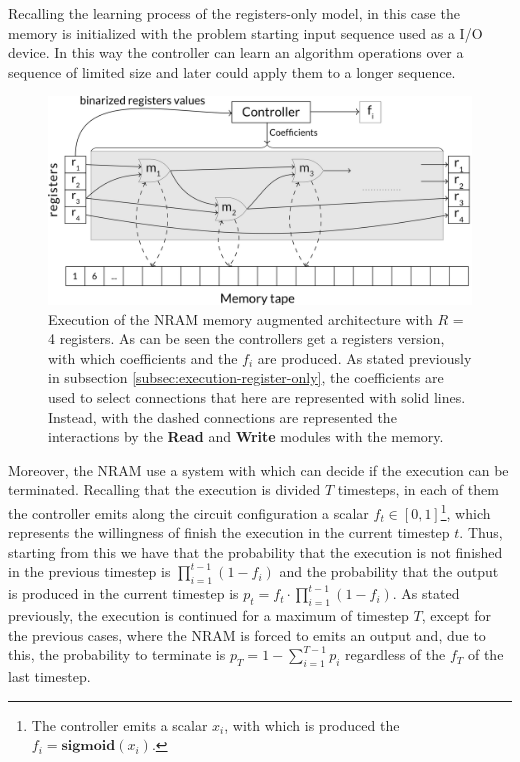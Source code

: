 Recalling the learning process of the registers-only model, in this case the memory is initialized with the problem starting input sequence used as a I/O device. In this way the controller can learn an algorithm operations over a sequence of limited size and later could apply them to a longer sequence.\newline
\begin{figure}[t!]
	\centering
	\includegraphics[width=\textwidth]{figures/memory-augmented-model.png}
	\caption{Execution of the NRAM memory augmented architecture with $R$ = 4 registers. As can be seen the controllers get a registers  version, with which coefficients and the $f_{i}$ are produced. As stated previously in subsection \ref{subsec:execution-register-only}, the coefficients are used to select connections that here are represented with solid lines. Instead, with the dashed connections are represented the interactions by the \textbf{Read} and \textbf{Write} modules with the memory.}
	\label{fig:perceptron-boundaries}
\end{figure}
Moreover, the NRAM use a system with which can decide if the execution can be terminated. Recalling that the execution is divided $T$ timesteps, in each of them the controller emits along the circuit configuration a scalar $f_{t} \in [0, 1]$\footnote{The controller emits a scalar $x_{i}$, with which is produced the $f_i = \textbf{sigmoid}(x_{i})$.}, which represents the willingness of finish the execution in the current timestep $t$. Thus, starting from this we have that the probability that the execution is not finished in the previous timestep is $\prod\limits_{i=1}^{t-1}(1 - f_{i})$ and the probability that the output is produced in the current timestep is $p_{t} = f_{t} \cdot \prod\limits_{i=1}^{t-1}(1 - f_{i})$. As stated previously, the execution is continued for a maximum of timestep $T$, except for the previous cases, where the NRAM is forced to emits an output and, due to this, the probability to terminate is $p_{T} = 1 - \sum\limits_{i=1}^{T-1}p_{i}$ regardless of the $f_{T}$ of the last timestep.

